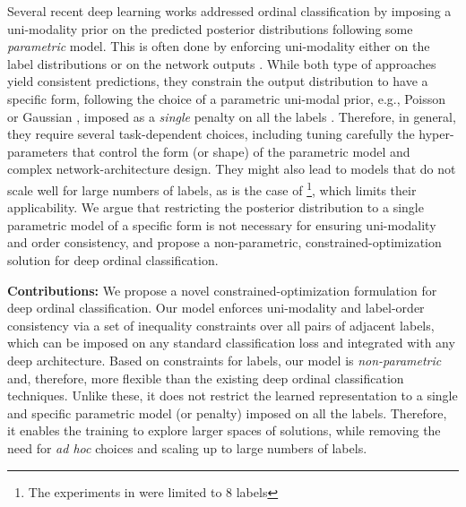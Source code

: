 \documentclass[8pt]{article}
\theoremstyle{definition}
\begin{document}
Several recent deep learning works addressed ordinal classification by imposing a uni-modality prior on the predicted posterior distributions following some {\em parametric} model. This is often done by enforcing uni-modality either on the label distributions \citep{beckham2016simple,cheng2008neural,gao2017deep,geng2016label,geng2013facial,huo2016deep,pan2018mean} or on the network outputs
\citep{beckham2017unimodal,da2005classification}. While both type of approaches yield consistent predictions, they
constrain  the  output  distribution  to  have  a  specific form, following the choice of a parametric uni-modal prior, e.g., Poisson \citep{beckham2017unimodal} or Gaussian \citep{gao2017deep,geng2016label,geng2013facial,huo2016deep}, imposed as a {\em single} penalty on all the labels . Therefore, in general, they require
several task-dependent choices, including tuning carefully the hyper-parameters that control the form (or shape) of the parametric model and complex network-architecture design. They might also lead to models that do not scale well for large numbers of labels, as is the case of \citep{beckham2017unimodal}\footnote{The experiments in \citep{beckham2017unimodal} were limited to 8 labels}, which limits their applicability.
We argue that restricting the posterior distribution to a single parametric model of a specific form is not necessary for ensuring uni-modality and order consistency, and propose a non-parametric,  constrained-optimization solution for deep ordinal classification.

{\bf Contributions:} We propose a novel constrained-optimization formulation for deep ordinal classification. Our model enforces uni-modality and label-order consistency via a set of inequality constraints over all pairs of adjacent labels, which can be imposed on any standard classification loss and integrated with any deep architecture. Based on  constraints for  labels, our model is {\em non-parametric} and, therefore, more flexible than the existing deep ordinal classification techniques. Unlike these, it does not restrict the learned representation to a single and specific parametric model (or penalty) imposed on all the labels. Therefore, it enables the training to explore larger spaces of solutions, while removing the need for {\em ad hoc} choices and scaling up to large numbers of labels.
\end{document}
